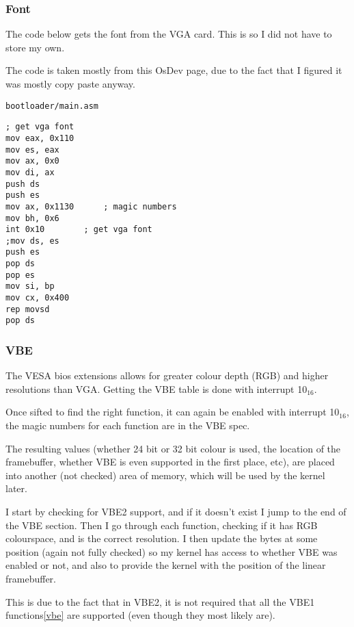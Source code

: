 \documentclass{article}
\begin{document}
\subsubsection{Font}

The code below gets the font from the VGA card. This
is so I did not have to store my own.

The code is taken mostly from this OsDev page\cite{get vga font},
due to the fact that I figured it was mostly copy paste anyway.

\begin{verbatim}
bootloader/main.asm
\end{verbatim}
\begin{verbatim}
; get vga font
mov eax, 0x110
mov es, eax
mov ax, 0x0
mov di, ax
push ds
push es
mov ax, 0x1130		; magic numbers
mov bh, 0x6
int 0x10		; get vga font
;mov ds, es
push es
pop ds
pop es
mov si, bp
mov cx, 0x400
rep movsd
pop ds
\end{verbatim}

\subsubsection{VBE}

The VESA bios extensions allows for greater colour depth (RGB) and higher
resolutions than VGA. Getting the VBE table is done with interrupt 10$_{16}$\cite{vbe}.

Once sifted to find the right function, it can again be enabled with
interrupt 10$_{16}$, the magic numbers for each function are in the
VBE spec\cite{vbe}.

The resulting values (whether 24 bit or 32 bit colour is used, the location of
the framebuffer, whether VBE is even supported in the first place, etc), are placed
into another (not checked) area of memory, which will be used by the kernel later.

I start by checking for VBE2 support, and if it doesn't exist I jump to the end of
the VBE section.
Then I go through each function, checking if it has RGB colourspace, and is the
correct resolution.
I then update the bytes at some position (again not fully checked) so my kernel has access
to whether VBE was enabled or not, and also to provide the kernel with
the position of the linear framebuffer.

This is due to the fact that in VBE2, it is not required that all the VBE1 functions\ref{vbe}
are supported (even though they most likely are).
\end{document}

